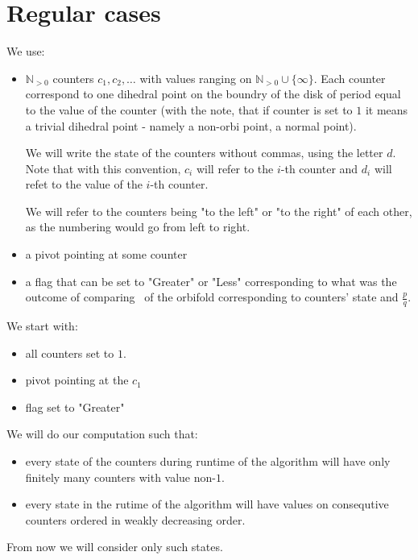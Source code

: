 \section{Regular cases}
We use: 
\begin{itemize}
\item $\mathbb{N}_{>0}$ counters $c_1, c_2, \dots$ 
with values ranging on $\mathbb{N}_{>0}\cup\{\infty\}$.
Each counter correspond to one dihedral point 
on the boundry of the disk of period equal to the value of the counter (with the note, that 
if counter is set to $1$ it means a trivial dihedral point - namely a non-orbi point, 
a normal point). 

We will write the state of the counters without commas, using the letter $d$. 
Note that with this convention, $c_i$ will refer to the $i$-th counter and $d_i$ will 
refet to the value of the $i$-th counter. 

We will refer to the counters being "to the left" or "to the right" of each other, as 
the numbering would go from left to right.

\item a pivot pointing at some counter 
\item a flag that can be set to "Greater" or "Less" corresponding to what was 
the outcome of comparing \Eoc\ of the orbifold corresponding to counters' state and 
$\frac{p}{q}$.  
\end{itemize}

We start with:
\begin{itemize}
\item all counters set to $1$. 
\item pivot pointing at the $c_1$
\item flag set to "Greater"
\end{itemize}

\begin{claim}\label{valid state of counters}
We will do our computation such that:
\begin{itemize}
\item every state of the counters during runtime of the algorithm will have only finitely many 
counters with value non-$1$. 
\item every state in the rutime of the algorithm 
will have values on consequtive counters ordered in weakly decreasing order.
\end{itemize}
\end{claim}
From now we will 
consider only such states. 

